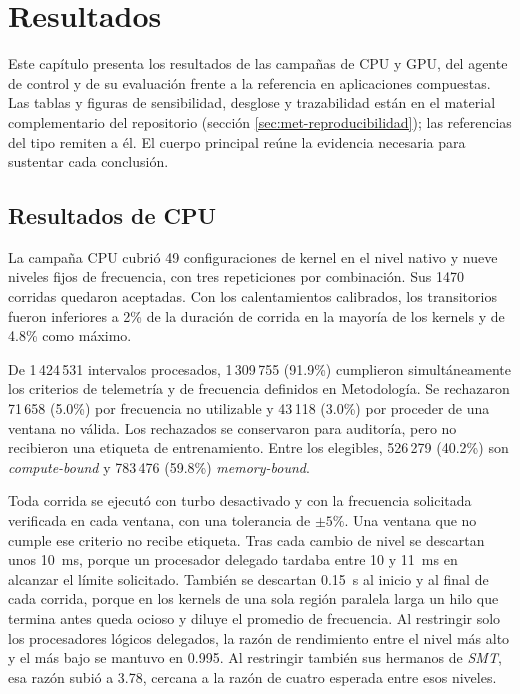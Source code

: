 \chapter{Resultados}
\label{sec:resultados}

Este capítulo presenta los resultados de las campañas de CPU y GPU, del agente de control y de su evaluación frente a la referencia en aplicaciones compuestas. Las tablas y figuras de sensibilidad, desglose y trazabilidad están en el material complementario del repositorio (sección \ref{sec:met-reproducibilidad}); las referencias del tipo  remiten a él. El cuerpo principal reúne la evidencia necesaria para sustentar cada conclusión.

\section{Resultados de CPU}
\label{sec:resultados-cpu}

La campaña CPU cubrió 49 configuraciones de kernel en el nivel nativo y nueve niveles fijos de frecuencia, con tres repeticiones por combinación. Sus 1470 corridas quedaron aceptadas. Con los calentamientos calibrados, los transitorios fueron inferiores a 2\% de la duración de corrida en la mayoría de los kernels y de 4.8\% como máximo.

De 1\,424\,531 intervalos procesados, 1\,309\,755 (91.9\%) cumplieron simultáneamente los criterios de telemetría y de frecuencia definidos en Metodología. Se rechazaron 71\,658 (5.0\%) por frecuencia no utilizable y 43\,118 (3.0\%) por proceder de una ventana no válida. Los rechazados se conservaron para auditoría, pero no recibieron una etiqueta de entrenamiento. Entre los elegibles, 526\,279 (40.2\%) son \textit{compute-bound} y 783\,476 (59.8\%) \textit{memory-bound}.

\label{sec:auditoria-frecuencia-cpu}
Toda corrida se ejecutó con turbo desactivado y con la frecuencia solicitada verificada en cada ventana, con una tolerancia de $\pm5\%$. Una ventana que no cumple ese criterio no recibe etiqueta. Tras cada cambio de nivel se descartan unos 10~ms, porque un procesador delegado tardaba entre 10 y 11~ms en alcanzar el límite solicitado. También se descartan 0.15~s al inicio y al final de cada corrida, porque en los kernels de una sola región paralela larga un hilo que termina antes queda ocioso y diluye el promedio de frecuencia. Al restringir solo los procesadores lógicos delegados, la razón de rendimiento entre el nivel más alto y el más bajo se mantuvo en 0.995. Al restringir también sus hermanos de \textit{SMT}, esa razón subió a 3.78, cercana a la razón de cuatro esperada entre esos niveles.

